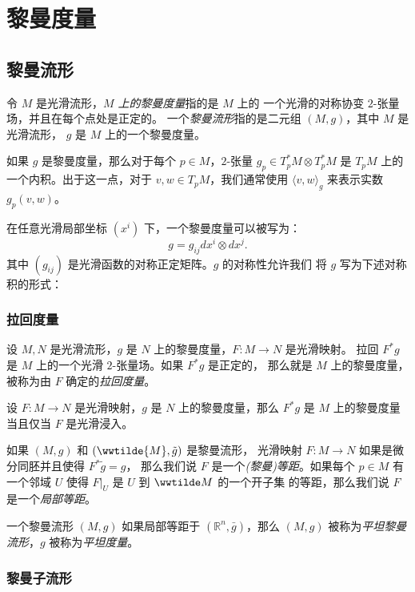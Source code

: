 \documentclass[fontset=none]{Notes}
\begin{document}
\chapter{黎曼度量}

\section{黎曼流形}

令 $M$ 是光滑流形，\emph{$M$ 上的黎曼度量}指的是 $M$ 上的
一个光滑的对称协变 $2$-张量场，并且在每个点处是正定的。
一个\emph{黎曼流形}指的是二元组 $(M,g)$，其中 $M$ 是光滑流形，
$g$ 是 $M$ 上的一个黎曼度量。

如果 $g$ 是黎曼度量，那么对于每个 $p\in M$，$2$-张量 $g_p\in T_p^*M\otimes T_p^*M$
是 $T_pM$ 上的一个内积。出于这一点，对于 $v,w\in T_pM$，我们通常使用 $\langle v,w\rangle_g$
来表示实数 $g_p(v,w)$。

在任意光滑局部坐标 $\left(x^i\right)$ 下，一个黎曼度量可以被写为：
\[
  g=g_{ij}dx^i\otimes dx^j.  
\]
其中 $(g_{ij})$ 是光滑函数的对称正定矩阵。$g$ 的对称性允许我们
将 $g$ 写为下述对称积的形式：


\subsection{拉回度量}

设 $M,N$ 是光滑流形，$g$ 是 $N$ 上的黎曼度量，$F:M\to N$ 是光滑映射。
拉回 $F^*g$ 是 $M$ 上的一个光滑 $2$-张量场。如果 $F^*g$ 是正定的，
那么就是 $M$ 上的黎曼度量，被称为由 $F$ 确定的\emph{拉回度量}。

\begin{proposition}[拉回度量判别法]
  设 $F:M\to N$ 是光滑映射，$g$ 是 $N$ 上的黎曼度量，那么 
  $F^*g$ 是 $M$ 上的黎曼度量当且仅当 $F$ 是光滑浸入。
\end{proposition}

如果 $(M,g)$ 和 $(\wwtilde{M},\tilde g)$ 是黎曼流形，
光滑映射 $F:M\to N$ 如果是微分同胚并且使得 $F^*\tilde g=g$，
那么我们说 $F$ 是一个\emph{(黎曼)等距}。如果每个 $p\in M$
有一个邻域 $U$ 使得 $F|_U$ 是 $U$ 到 $\wwtilde M$ 的一个开子集
的等距，那么我们说 $F$ 是一个\emph{局部等距}。

一个黎曼流形 $(M,g)$ 如果局部等距于 $(\mathbb{R}^n,\bar g)$，那么
$(M,g)$ 被称为\emph{平坦黎曼流形}，$g$ 被称为\emph{平坦度量}。

\subsection{黎曼子流形}
\end{document}
